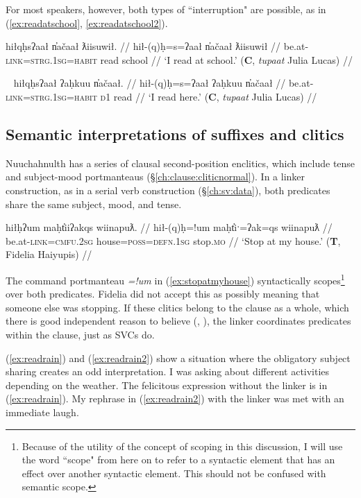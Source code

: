 \noindent For most speakers, however, both types of ``interruption" are possible, as in (\ref{ex:readatschool}, \ref{ex:readatschool2}).

\ex \label{ex:readatschool}
\begingl
\glpreamble hiłqḥsʔaał n̓ačaał ƛiisuwił. //
\gla hił-(q)ḥ=s=ʔaał n̓ačaał ƛiisuwił //
\glb be.at-\textsc{link}=\textsc{strg.1sg}=\textsc{habit} read school //
\glft `I read at school.' (\textbf{C}, \textit{tupaat} Julia Lucas) //
\endgl
\xe

\ex~ \label{ex:readatschool2}
\begingl
\glpreamble hiłqḥsʔaał ʔaḥkuu n̓ačaał. //
\gla hił-(q)ḥ=s=ʔaał ʔaḥkuu n̓ačaał //
\glb be.at-\textsc{link}=\textsc{strg.1sg}=\textsc{habit} \textsc{d1} read //
\glft `I read here.' (\textbf{C}, \textit{tupaat} Julia Lucas) //
\endgl
\xe

\subsection{Semantic interpretations of suffixes and clitics} \label{ch:link:second}

Nuuchahnulth has a series of clausal second-position enclitics, which include tense and subject-mood portmanteaus (\S\ref{ch:clause:cliticnormal}). In a linker construction, as in a serial verb construction (\S\ref{ch:sv:data}), both predicates share the same subject, mood, and tense.

\ex \label{ex:stopatmyhouse}
\begingl
\glpreamble hiłḥʔum maḥt̓iiʔakqs wiinapuƛ. //
\gla hił-(q)ḥ=!um maḥt̓iˑ=ʔak=qs wiinapuƛ //
\glb be.at-\textsc{link}=\textsc{cmfu.2sg} house=\textsc{poss}=\textsc{defn.1sg} stop.\textsc{mo} //
\glft `Stop at my house.' (\textbf{T}, Fidelia Haiyupis) //
\endgl
\xe

The command portmanteau \textit{=!um} in (\ref{ex:stopatmyhouse}) syntactically scopes\footnote{Because of the utility of the concept of scoping in this discussion, I will use the word ``scope" from here on to refer to a syntactic element that has an effect over another syntactic element. This should not be confused with semantic scope.} over both predicates. Fidelia did not accept this as possibly meaning that someone else was stopping. If these clitics belong to the clause as a whole, which there is good independent reason to believe (\citet[p.~35--36]{rose1981}, \citet[p.~42--50]{woo2007b}), the linker coordinates predicates within the clause, just as SVCs do.

(\ref{ex:readrain}) and (\ref{ex:readrain2}) show a situation where the obligatory subject sharing creates an odd interpretation. I was asking about different activities depending on the weather. The felicitous expression without the linker is in (\ref{ex:readrain}). My rephrase in (\ref{ex:readrain2}) with the linker was met with an immediate laugh.

